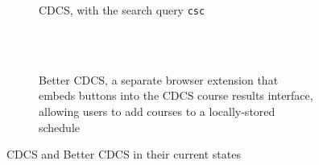 \begin{figure}
    \centering
        \begin{subfigure}[h]{14cm}
            \centering
            \caption{CDCS, with the search query {\tt csc}}
            \label{fig:cdcs-index}
        \end{subfigure}\\
        \vspace{10pt}\\
        \begin{subfigure}[h]{14cm}
            \centering
            \caption{Better CDCS, a separate browser extension that embeds buttons into the CDCS course results interface, allowing users to add courses to a locally-stored schedule}
            \label{fig:cdcs-better}
        \end{subfigure}
    \caption{CDCS and Better CDCS in their current states}
\end{figure}


